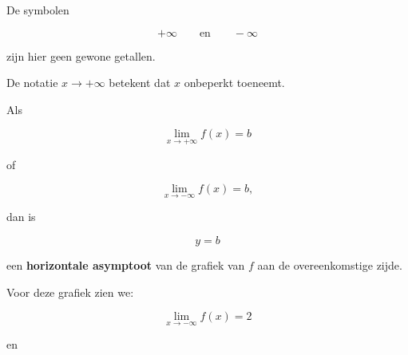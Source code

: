 \documentclass{ximera}
\begin{document}
\begin{opmerking}
De symbolen

\[
+\infty
\qquad\text{en}\qquad
-\infty
\]

zijn hier geen gewone getallen.

De notatie $x\to+\infty$ betekent dat $x$ onbeperkt toeneemt.
\end{opmerking}




\begin{definitie}

Als

\[
\lim_{x\to+\infty}f(x)=b
\]

of

\[
\lim_{x\to-\infty}f(x)=b,
\]

dan is

\[
\boxed{y=b}
\]

een \textbf{horizontale asymptoot} van de grafiek van $f$ aan de
overeenkomstige zijde.

\end{definitie}



\begin{center}
\end{center}

Voor deze grafiek zien we:

\[
\lim_{x\to-\infty}f(x)=2
\]

en
\end{document}
